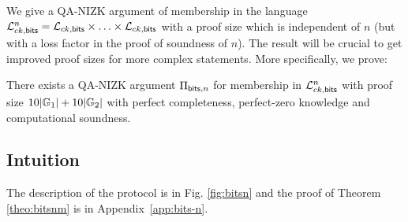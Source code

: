 We give a QA-NIZK argument of membership in the language $\mathcal{L}_{ck,\mathsf{bits}}^n  = \mathcal{L}_{ck,\mathsf{bits}} \times \ldots \times \mathcal{L}_{ck,\mathsf{bits}}$ with a proof size which is independent of $n$ (but with a loss factor in the proof of soundness of $n$). The result will be crucial to get improved proof sizes for more complex statements. More specifically, we prove: 

\begin{theorem} \label{theo:bitsnm} There exists a QA-NIZK argument $\Pi_{\mathsf{bits},n}$  for membership in $\mathcal{L}_{ck,\mathsf{bits}}^n$ with proof size  
$10|\mathbb{G}_1|+10|\mathbb{G}_2|$ with perfect completeness, perfect-zero knowledge and computational soundness. 
\end{theorem}

\subsection{Intuition}


The description of the protocol is in Fig. \ref{fig:bitsn} and the proof of Theorem \ref{theo:bitsnm} is in Appendix~\ref{app:bits-n}.


